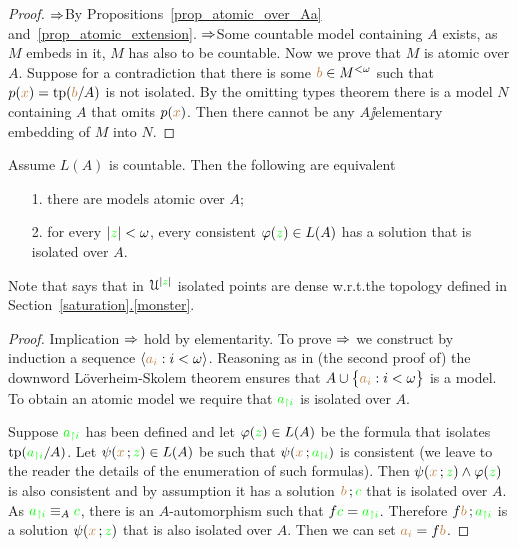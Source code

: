 \documentclass[creche.tex]{subfiles}
\begin{document}
\begin{proof}
$\Rightarrow$\quad By Propositions~\ref{prop_atomic_over_Aa} and~\ref{prop_atomic_extension}.
$\Rightarrow$\quad Some countable model containing $A$ exists, as $M$ embeds in it, $M$ has also to be countable.
Now we prove that $M$ is atomic over $A$.
Suppose for a contradiction that there is some ${\color{brown} b}\in M^{<\omega}$ such that $p({\color{brown} x})={\rm tp}({\color{brown} b}/A)$ is not isolated.
By the omitting types theorem there is a model $N$ containing $A$ that omits $p({\color{brown} x})$.
Then there cannot be any $A\jj$elementary embedding of $M$ into $N$.
\end{proof}

\begin{proposition}\label{prop_idolated_type_dense}
Assume $L(A)$ is countable.
Then the following are equivalent
\begin{itemize}
\item[1.] there are models atomic over $A$;
\item[2.] for every $|{\color{green} z}|<\omega$, every consistent $\varphi({\color{green} z})\in L(A)$ has a solution that is isolated over $A$.
\end{itemize}
\end{proposition} 
Note that  says that in $\EuScript U^{|{\color{green} z}|}$ isolated points are dense w.r.t.\@ the topology defined in Section~\hyperref[saturation]{\ref*{saturation}.\ref*{monster}}.
\begin{proof}
Implication $\Rightarrow$ hold by elementarity.
To prove $\Rightarrow$ we construct by induction a sequence $\langle{\color{brown}a_i}:i<\omega\rangle$.
Reasoning as in (the second proof of) the downword L\"overheim-Skolem theorem ensures that $A\cup\big\{{\color{brown} a_i}:i<\omega\big\}$ is a model.
To obtain an atomic model we require that ${\color{green} a_{\restriction i}}$ is isolated over $A$.


Suppose ${\color{green} a_{\restriction i}}$ has been defined and let $\varphi({\color{green} z})\in L(A)$ be the formula that isolates ${\rm tp}({\color{green} a_{\restriction i}}/A)$.
Let $\psi({\color{brown} x}\,;{\color{green} z})\in L(A)$ be such that $\psi({\color{brown} x}\,;{\color{green} a_{\restriction i}})$ is consistent (we leave to the reader the details of the enumeration of such formulas).
Then $\psi({\color{brown} x}\,;{\color{green} z})\wedge\varphi({\color{green} z})$ is also consistent and by assumption it has a solution ${\color{brown} b}\,;{\color{green} c}$ that is isolated over $A$.
As ${\color{green} a_{\restriction i}}\equiv_A{\color{green} c}$, there is an $A$-automorphism such that $f{\color{green} c}={\color{green} a_{\restriction i}}$.
Therefore $f{\color{brown} b}\,;{\color{green} a_{\restriction i}}$ is a solution $\psi({\color{brown} x}\,;{\color{green} z})$ that is also isolated over $A$.
Then we can set ${\color{brown} a_i}=f{\color{brown} b}$.

\end{proof}
\end{document}
